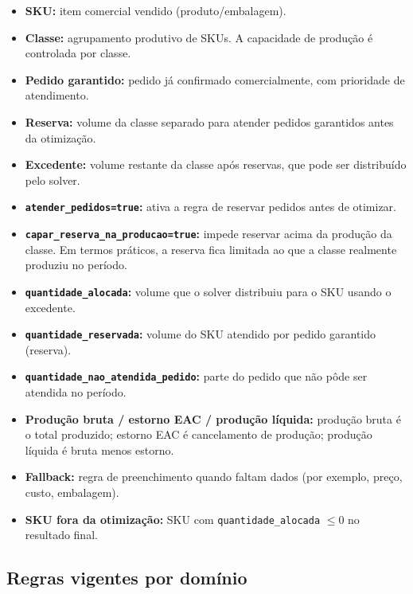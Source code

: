 \documentclass[11pt,a4paper]{article}
\begin{document}
\begin{itemize}
    \item \textbf{SKU:} item comercial vendido (produto/embalagem).
    \item \textbf{Classe:} agrupamento produtivo de SKUs. A capacidade de produção
    é controlada por classe.
    \item \textbf{Pedido garantido:} pedido já confirmado comercialmente, com
    prioridade de atendimento.
    \item \textbf{Reserva:} volume da classe separado para atender pedidos
    garantidos antes da otimização.
    \item \textbf{Excedente:} volume restante da classe após reservas, que pode
    ser distribuído pelo solver.
    \item \textbf{\texttt{atender\_pedidos=true}:} ativa a regra de reservar
    pedidos antes de otimizar.
    \item \textbf{\texttt{capar\_reserva\_na\_producao=true}:} impede reservar
    acima da produção da classe. Em termos práticos, a reserva fica limitada ao
    que a classe realmente produziu no período.
    \item \textbf{\texttt{quantidade\_alocada}:} volume que o solver distribuiu
    para o SKU usando o excedente.
    \item \textbf{\texttt{quantidade\_reservada}:} volume do SKU atendido por
    pedido garantido (reserva).
    \item \textbf{\texttt{quantidade\_nao\_atendida\_pedido}:} parte do pedido
    que não pôde ser atendida no período.
    \item \textbf{Produção bruta / estorno EAC / produção líquida:}
    produção bruta é o total produzido; estorno EAC é cancelamento de produção;
    produção líquida é bruta menos estorno.
    \item \textbf{Fallback:} regra de preenchimento quando faltam dados
    (por exemplo, preço, custo, embalagem).
    \item \textbf{SKU fora da otimização:} SKU com
    \texttt{quantidade\_alocada} \(\le 0\) no resultado final.
\end{itemize}

\subsection{Regras vigentes por domínio}
\end{document}
